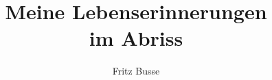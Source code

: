 \documentclass[a5paper,pagesize,10pt,twoside=true]{scrbook}
\begin{document}
\author{Fritz Busse\\ \\ \\ \\ \\ }
\title{Meine Lebenserinnerungen\\ im Abriss}

\date{}


\maketitle



\tableofcontents

\mbox{}
\newpage

\chapter*{}
\end{document}

